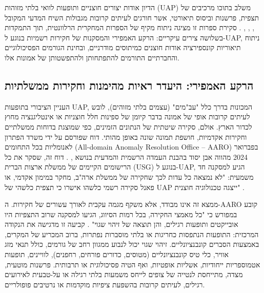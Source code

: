 \documentclass[12pt,a4paper]{article}
\begin{document}
הדיון אודות יצורים חוצניים ותופעות לוואי בלתי מזוהות (UAP) משלב בתוכו מרכיבים של תצפית, פרשנות וביסוס תיאורטי, אשר חורגים לעיתים קרובות מגבולות השיח המדעי המקובל \cite{aaro2024misidentification}, \cite{aaro2024noevidence}, \cite{wojcik2021cosmologies}, \cite{bowes2023conspiracy, biddlestone2025conspiracy, ellwood1999ufo}. סקירת ספרות זו מציגה ניתוח מקיף של הספרות המחקרית הרלוונטית, תוך התמקדות בשלושה צירים עיקריים: הרקע האמפירי והמסקנות של חקירות רשמיות בנוגע ל-UAP, ניתוח תיאוריות קונספירציה אודות חוצנים כמיתוסים מודרניים, ובחינת הגורמים הפסיכולוגיים והחברתיים התורמים להתפתחותן ולהתפשטותן של אמונות אלו.

\subsection{הרקע האמפירי: היעדר ראיות מהימנות וחקירות ממשלתיות}

העניין הציבורי בתופעות UAP, המכונות בדרך כלל "עב"מים" (עצמים בלתי מזוהים), לובש לעיתים קרובות אופי של אמונה בדבר קיומן של ספינות חלל חוצניות או אינטליגנציה מחוץ לכדור הארץ. אולם, סקירה שיטתית של הנתונים הזמינים, כפי שמוצגת בדוחות ממשלתיים וחקירות אקדמיות, חושפת תמונה שונה באופן מהותי. דוח שפורסם על ידי משרד הפתרון לאנומליות בכל התחומים (All-domain Anomaly Resolution Office – AARO) בפברואר 2024 מהווה אבן יסוד בהבנת העמדה הרשמית והמדעית בנושא \cite{aaro2024misidentification}, \cite{aaro2024noevidence}. דוח זה, שסקר את כל הרישומים הקיימים של ממשלת ארצות הברית (USG) בנוגע ל-UAP, הגיע למסקנה חד משמעית: "לא נמצאה כל עדות לכך שחקירה של ממשלת ארה"ב, מחקר במימון אקדמי, או פאנל סקירה רשמי כלשהו אישרו כי תצפית כלשהי של UAP ייצגה טכנולוגיה חוצנית" \cite{aaro2024misidentification}.

ממצא זה אינו מבודד, אלא משקף מגמה עקבית לאורך עשורים של חקירות. ה-AARO קובע במפורש כי "כל מאמצי החקירה, בכל רמות הסיווג, הגיעו למסקנה שרוב התצפיות היו אובייקטים ותופעות רגילים, והן תוצאה של זיהוי שגוי" \cite{aaro2024misidentification}. קביעה זו מדגישה את הנקודה המרכזית: התופעות הנתפסות כחריגות או בלתי מוסברות נפתרות, ברוב המכריע של המקרים, באמצעות הסברים קונבנציונליים. זיהוי שגוי יכול לנבוע ממגוון רחב של גורמים, כולל תנאי מזג אוויר, כלי טיס קונבנציונליים (מטוסים, כדורים פורחים, רחפנים), לוויינים, תופעות אטמוספריות ייחודיות, אשליות אופטיות, ואף הטיה פסיכולוגית או תרבותית. פרשנות מוטעית, מצדה, מתייחסת לנטייה של צופים לייחס משמעות בלתי רגילה או על-טבעית לאירועים רגילים, לעיתים קרובות בהשפעת ציפיות מוקדמות או נרטיבים פופולריים.
\end{document}
